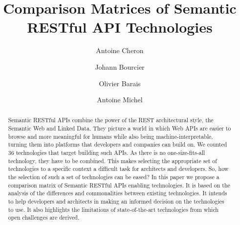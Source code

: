 \documentclass[runningheads]{llncs}
\begin{document}
%
\title{Comparison Matrices of Semantic RESTful API Technologies}
%
%
\author{Antoine Cheron \and
Johann Bourcier \and
Olivier Barais \and
Antoine Michel}
%
%
%
\maketitle              %

\begin{abstract}
Semantic RESTful APIs combine the power of the REST architectural style, the Semantic Web and Linked Data. They picture a world in which Web APIs are easier to browse and more meaningful for humans while also being machine-interpretable, turning them into platforms that developers and companies can build on. We counted 36 technologies that target building such APIs. As there is no one-size-fits-all technology, they have to be combined. This makes selecting the appropriate set of technologies to a specific context a difficult task for architects and developers. So, how the selection of such a set of technologies can be eased?
In this paper we propose a comparison matrix of Semantic RESTful APIs enabling technologies. It is based on the analysis of the differences and commonalities between existing technologies. It intends to help developers and architects in making an informed decision on the technologies to use. It also highlights the limitations of state-of-the-art technologies from which open challenges are derived.

\end{abstract}
%







%
%
%
% 
% 
%



\end{document}
